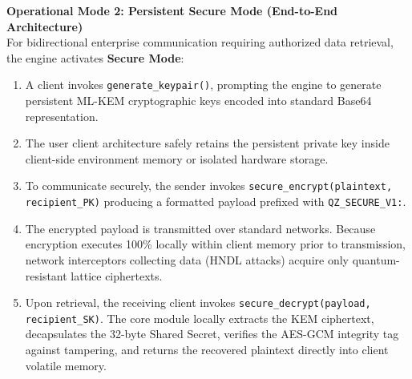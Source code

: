 \documentclass[12pt, a4paper]{article}
\begin{document}
\vspace{0.5em}
\noindent \textbf{Operational Mode 2: Persistent Secure Mode (End-to-End Architecture)} \\
For bidirectional enterprise communication requiring authorized data retrieval, the engine activates \textbf{Secure Mode}:
\begin{enumerate}
    \item A client invokes \texttt{generate\_keypair()}, prompting the engine to generate persistent ML-KEM cryptographic keys encoded into standard Base64 representation.
    \item The user client architecture safely retains the persistent private key inside client-side environment memory or isolated hardware storage.
    \item To communicate securely, the sender invokes \texttt{secure\_encrypt(plaintext, recipient\_PK)} producing a formatted payload prefixed with \texttt{QZ\_SECURE\_V1:}.
    \item The encrypted payload is transmitted over standard networks. Because encryption executes 100\% locally within client memory prior to transmission, network interceptors collecting data (HNDL attacks) acquire only quantum-resistant lattice ciphertexts.
    \item Upon retrieval, the receiving client invokes \texttt{secure\_decrypt(payload, recipient\_SK)}. The core module locally extracts the KEM ciphertext, decapsulates the 32-byte Shared Secret, verifies the AES-GCM integrity tag against tampering, and returns the recovered plaintext directly into client volatile memory.
\end{enumerate}
\end{document}
